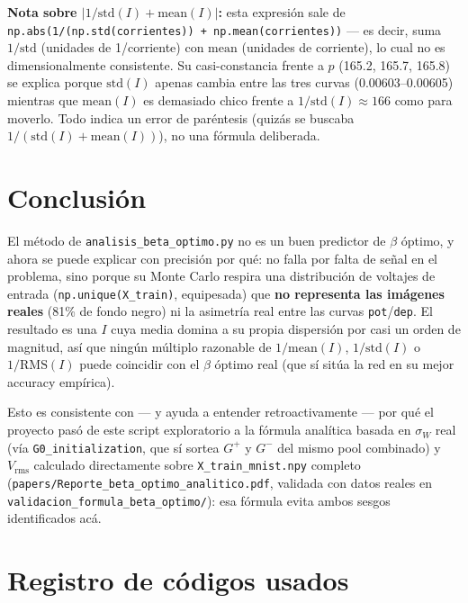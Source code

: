 \documentclass[11pt]{article}
\begin{document}
\textbf{Nota sobre $|1/\mathrm{std}(I)+\mathrm{mean}(I)|$:} esta expresión
sale de \texttt{np.abs(1/(np.std(corrientes)) + np.mean(corrientes))} ---
es decir, suma $1/\mathrm{std}$ (unidades de 1/corriente) con
$\mathrm{mean}$ (unidades de corriente), lo cual no es dimensionalmente
consistente. Su casi-constancia frente a $p$ (165.2, 165.7, 165.8) se
explica porque $\mathrm{std}(I)$ apenas cambia entre las tres curvas
(0.00603--0.00605) mientras que $\mathrm{mean}(I)$ es demasiado chico
frente a $1/\mathrm{std}(I)\approx166$ como para moverlo. Todo indica un
error de paréntesis (quizás se buscaba $1/(\mathrm{std}(I)+\mathrm{mean}(I))$),
no una fórmula deliberada.

\section{Conclusión}

El método de \texttt{analisis\_beta\_optimo.py} no es un buen predictor de
$\beta$ óptimo, y ahora se puede explicar con precisión por qué: no falla
por falta de señal en el problema, sino porque su Monte Carlo respira una
distribución de voltajes de entrada (\texttt{np.unique(X\_train)},
equipesada) que \textbf{no representa las imágenes reales} (81\% de fondo
negro) ni la asimetría real entre las curvas \texttt{pot}/\texttt{dep}. El
resultado es una $I$ cuya media domina a su propia dispersión por casi un
orden de magnitud, así que ningún múltiplo razonable de
$1/\mathrm{mean}(I)$, $1/\mathrm{std}(I)$ o $1/\mathrm{RMS}(I)$ puede
coincidir con el $\beta$ óptimo real (que sí sitúa la red en su mejor
accuracy empírica).

Esto es consistente con --- y ayuda a entender retroactivamente --- por
qué el proyecto pasó de este script exploratorio a la fórmula analítica
basada en $\sigma_W$ real (vía \texttt{G0\_initialization}, que sí sortea
$G^+$ y $G^-$ del mismo pool combinado) y $V_{\mathrm{rms}}$ calculado
directamente sobre \texttt{X\_train\_mnist.npy} completo
(\texttt{papers/Reporte\_beta\_optimo\_analitico.pdf}, validada con datos
reales en \texttt{validacion\_formula\_beta\_optimo/}): esa fórmula evita
ambos sesgos identificados acá.

\section{Registro de códigos usados}
\end{document}
